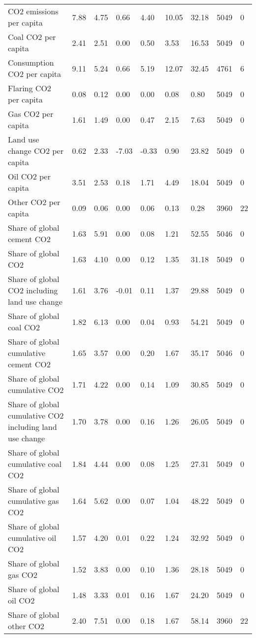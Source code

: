 \begin{longtable}{lllllllll}
CO2 emissions per capita & 7.88 & 4.75 & 0.66 & 4.40 & 10.05 & 32.18 & 5049 & 0\\
Coal CO2 per capita & 2.41 & 2.51 & 0.00 & 0.50 & 3.53 & 16.53 & 5049 & 0\\
Consumption CO2 per capita & 9.11 & 5.24 & 0.66 & 5.19 & 12.07 & 32.45 & 4761 & 6\\
\addlinespace
Flaring CO2 per capita & 0.08 & 0.12 & 0.00 & 0.00 & 0.08 & 0.80 & 5049 & 0\\
Gas CO2 per capita & 1.61 & 1.49 & 0.00 & 0.47 & 2.15 & 7.63 & 5049 & 0\\
Land use change CO2 per capita & 0.62 & 2.33 & -7.03 & -0.33 & 0.90 & 23.82 & 5049 & 0\\
Oil CO2 per capita & 3.51 & 2.53 & 0.18 & 1.71 & 4.49 & 18.04 & 5049 & 0\\
Other CO2 per capita & 0.09 & 0.06 & 0.00 & 0.06 & 0.13 & 0.28 & 3960 & 22\\
\addlinespace
Share of global cement CO2 & 1.63 & 5.91 & 0.00 & 0.08 & 1.21 & 52.55 & 5046 & 0\\
Share of global CO2 & 1.63 & 4.10 & 0.00 & 0.12 & 1.35 & 31.18 & 5049 & 0\\
Share of global CO2 including land use change & 1.61 & 3.76 & -0.01 & 0.11 & 1.37 & 29.88 & 5049 & 0\\
Share of global coal CO2 & 1.82 & 6.13 & 0.00 & 0.04 & 0.93 & 54.21 & 5049 & 0\\
Share of global cumulative cement CO2 & 1.65 & 3.57 & 0.00 & 0.20 & 1.67 & 35.17 & 5046 & 0\\
\addlinespace
Share of global cumulative CO2 & 1.71 & 4.22 & 0.00 & 0.14 & 1.09 & 30.85 & 5049 & 0\\
Share of global cumulative CO2 including land use change & 1.70 & 3.78 & 0.00 & 0.16 & 1.26 & 26.05 & 5049 & 0\\
Share of global cumulative coal CO2 & 1.84 & 4.44 & 0.00 & 0.08 & 1.25 & 27.31 & 5049 & 0\\
Share of global cumulative gas CO2 & 1.64 & 5.62 & 0.00 & 0.07 & 1.04 & 48.22 & 5049 & 0\\
Share of global cumulative oil CO2 & 1.57 & 4.20 & 0.01 & 0.22 & 1.24 & 32.92 & 5049 & 0\\
\addlinespace
Share of global gas CO2 & 1.52 & 3.83 & 0.00 & 0.10 & 1.36 & 28.18 & 5049 & 0\\
Share of global oil CO2 & 1.48 & 3.33 & 0.01 & 0.16 & 1.67 & 24.20 & 5049 & 0\\
Share of global other CO2 & 2.40 & 7.51 & 0.00 & 0.18 & 1.67 & 58.14 & 3960 & 22\\

\end{longtable}

